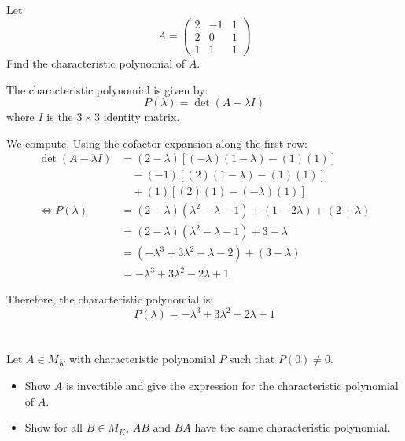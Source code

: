 \documentclass[12pt]{article}
\begin{document}
\section{}
Let 
\[
A = \begin{pmatrix}
2 & -1 & 1 \\
2 & 0 & 1 \\
1 & 1 & 1
\end{pmatrix}
\]
Find the characteristic polynomial of \( A \).

\begin{correctionbox}
The characteristic polynomial is given by:
\[
P(\lambda) = \det(A - \lambda I)
\]
where \(I\) is the \(3 \times 3\) identity matrix.

We compute, Using the cofactor expansion along the first row:
\begin{align*}
\det(A - \lambda I) &= (2-\lambda)\left[(-\lambda)(1-\lambda) - (1)(1)\right] \\
&\quad - (-1)\left[(2)(1-\lambda) - (1)(1)\right] \\
&\quad + (1)\left[(2)(1) - (-\lambda)(1)\right]\\
\iff P(\lambda) &= (2-\lambda)(\lambda^2 - \lambda - 1) + (1 - 2\lambda) + (2 + \lambda) \\
&= (2-\lambda)(\lambda^2 - \lambda - 1) + 3 - \lambda \\
&= (-\lambda^3 + 3\lambda^2 - \lambda - 2) + (3 - \lambda) \\
&= -\lambda^3 + 3\lambda^2 - 2\lambda + 1
\end{align*}

Therefore, the characteristic polynomial is:
\[
\boxed{P(\lambda) = -\lambda^3 + 3\lambda^2 - 2\lambda + 1}
\]
\end{correctionbox}

\section{}
Let \( A \in M_K \) with characteristic polynomial \( P \) such that \( P(0) \neq 0 \).
\begin{itemize}
    \item Show \( A \) is invertible and give the expression for the characteristic polynomial of \( A \).
    \item Show for all \( B \in M_K \), \( AB \) and \( BA \) have the same characteristic polynomial.
\end{itemize}
\end{document}
